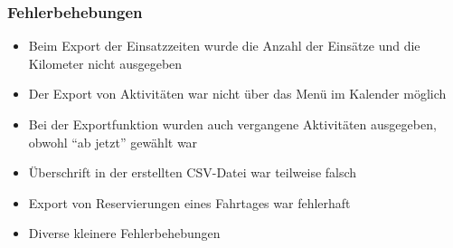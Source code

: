 \begin{neu}
\subsubsection{Fehlerbehebungen}
\begin{itemize}
  \item
  Beim Export der Einsatzzeiten wurde die Anzahl der Einsätze und die Kilometer nicht ausgegeben
  \item
  Der Export von Aktivitäten war nicht über das Menü im Kalender möglich
  \item
  Bei der Exportfunktion wurden auch vergangene Aktivitäten ausgegeben, obwohl "`ab jetzt"' gewählt war
  \item
  Überschrift in der erstellten CSV-Datei war teilweise falsch
  \item
  Export von Reservierungen eines Fahrtages war fehlerhaft
  \item
  Diverse kleinere Fehlerbehebungen
\end{itemize}
\end{neu}
